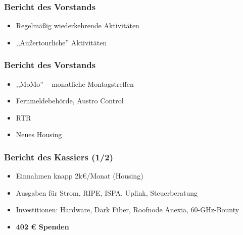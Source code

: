 \documentclass[17pt]{beamer} %
\begin{document}
\begin{frame}
	\frametitle{Bericht des Vorstands}
	\begin{itemize}
		\item Regelmäßig wiederkehrende Aktivitäten
		\item ,,Außertourliche'' Aktivitäten
	\end{itemize}
\end{frame}



\begin{frame}
	\frametitle{Bericht des Vorstands}
	\begin{itemize}
		\item ,,MoMo'' -- monatliche Montagstreffen
		\item Fernmeldebehörde, Austro Control
		\item RTR
		\item Neues Housing
	\end{itemize}
\end{frame}



\begin{frame}
	\frametitle{Bericht des Kassiers (1/2)}
	\begin{itemize}
		\item Einnahmen knapp 2k€/Monat (Housing)
		\item Ausgaben für Strom, RIPE, ISPA, Uplink, Steuerberatung
		\item Investitionen: Hardware, Dark Fiber, Roofnode Anexia, 60-GHz-Bounty
		\item \textbf{402 € Spenden}
	\end{itemize}
\end{frame}
\end{document}
